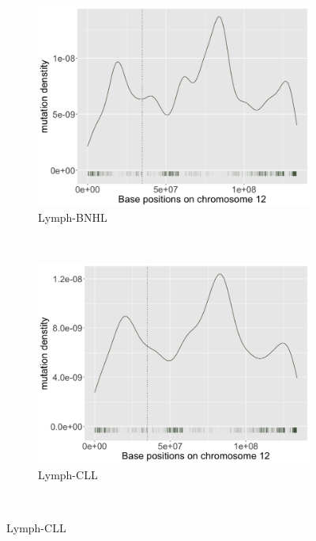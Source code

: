 \begin{figure}[h!]
    \begin{subfigure}{.5\textwidth}
    \includegraphics[width=\linewidth,height=0.6\textwidth]{graphics/mutdistribution_Lymph-BNHL.png}
    \caption{Lymph-BNHL}
    \end{subfigure}
    ~
    \begin{subfigure}{.5\textwidth}
    \includegraphics[width=\linewidth,height=0.6\textwidth]{graphics/mutdistribution_Lymph-CLL.png}
    \caption{Lymph-CLL}
    \end{subfigure} \\
    \vspace{0.2cm}
    

\end{figure}
